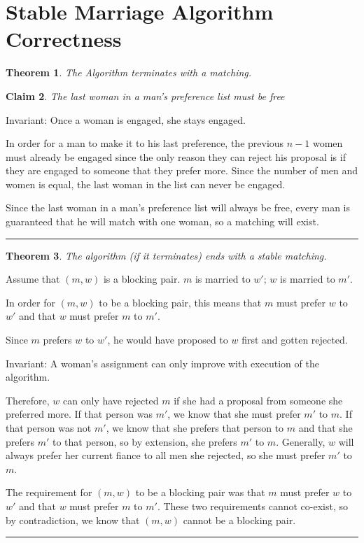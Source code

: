 \documentclass[twoside]{article}
\newcounter{lecnum}
\newtheorem{theorem}{Theorem}[lecnum]
\newtheorem{claim}[theorem]{Claim}
\newenvironment{proof}{{\bf Proof:}}{\hfill\rule{2mm}{2mm}}
\begin{document}
\section{Stable Marriage Algorithm Correctness}

\begin{theorem}
The Algorithm terminates with a matching.
\end{theorem}

\begin{proof}

\begin{claim}
The last woman in a man's preference list must be free
\end{claim}


Invariant: Once a woman is engaged, she stays engaged.

In order for a man to make it to his last preference, the previous $n-1$ women must already be engaged since the only reason they can reject his proposal is if they are engaged to someone that they prefer more. Since the number of men and women is equal, the last woman in the list can never be engaged.

Since the last woman in a man's preference list will always be free, every man is guaranteed that he will match with one woman, so a matching will exist.

\end{proof}

\begin{theorem}
The algorithm (if it terminates) ends with a stable matching.
\end{theorem}

\begin{proof}
Assume that $(m,w)$ is a blocking pair. $m$ is married to $w'$; $w$ is married to $m'$.

In order for $(m,w)$ to be a blocking pair, this means that $m$ must prefer $w$ to $w'$ and that $w$ must prefer $m$ to $m'$.

Since $m$ prefers $w$ to $w'$, he would have proposed to $w$ first and gotten rejected.

Invariant: A woman's assignment can only improve with execution of the algorithm.

Therefore, $w$ can only have rejected $m$ if she had a proposal from someone she preferred more. If that person was $m'$, we know that she must prefer $m'$ to $m$. If that person was not $m'$, we know that she prefers that person to $m$ and that she prefers $m'$ to that person, so by extension, she prefers $m'$ to $m$. Generally, $w$ will always prefer her current fiance to all men she rejected, so she must prefer $m'$ to $m$. 

The requirement for $(m,w)$ to be a blocking pair was that $m$ must prefer $w$ to $w'$ and that $w$ must prefer $m$ to $m'$. These two requirements cannot co-exist, so by contradiction, we know that $(m,w)$ cannot be a blocking pair.
\end{proof}
\end{document}
